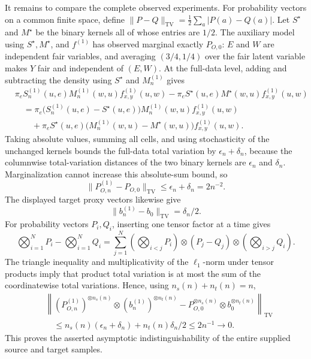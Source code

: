 It remains to compare the complete observed experiments.  For probability vectors on a common finite space, define
\(\lVert P-Q\rVert_{\mathrm{TV}}=\frac12\sum_a|P(a)-Q(a)|\).  Let \(S^{\star}\) and \(M^{\star}\) be the binary kernels all of whose entries are \(1/2\).  The auxiliary model using \(S^{\star},M^{\star}\), and \(f^{(1)}\) has observed marginal exactly \(P_{O,0}\): \(E\) and \(W\) are independent fair variables, and averaging \((3/4,1/4)\) over the fair latent variable makes \(Y\) fair and independent of \((E,W)\).  At the full-data level, adding and subtracting the density using \(S^{\star}\) and \(M_n^{(1)}\) gives
\[
\begin{aligned}
&\pi_eS_n^{(1)}(u,e)M_n^{(1)}(w,u)f^{(1)}_{x,y}(u,w)
-\pi_eS^{\star}(u,e)M^{\star}(w,u)f^{(1)}_{x,y}(u,w)\\
&\quad=\pi_e\bigl(S_n^{(1)}(u,e)-S^{\star}(u,e)\bigr)
M_n^{(1)}(w,u)f^{(1)}_{x,y}(u,w)\\
&\quad\quad+\pi_eS^{\star}(u,e)
\bigl(M_n^{(1)}(w,u)-M^{\star}(w,u)\bigr)f^{(1)}_{x,y}(u,w).
\end{aligned}
\]
Taking absolute values, summing all cells, and using stochasticity of the unchanged kernels bounds the full-data total variation by \(\epsilon_n+\delta_n\), because the columnwise total-variation distances of the two binary kernels are \(\epsilon_n\) and \(\delta_n\).  Marginalization cannot increase this absolute-sum bound, so
\[
\lVert P_{O,n}^{(1)}-P_{O,0}\rVert_{\mathrm{TV}}
\le\epsilon_n+\delta_n=2n^{-2}.
\]
The displayed target proxy vectors likewise give
\[
\lVert b_n^{(1)}-b_0\rVert_{\mathrm{TV}}=\delta_n/2.
\]
For probability vectors \(P_i,Q_i\), inserting one tensor factor at a time gives
\[
\bigotimes_{i=1}^N P_i-\bigotimes_{i=1}^N Q_i
=\sum_{j=1}^N
\left(\bigotimes_{i<j}P_i\right)\otimes(P_j-Q_j)\otimes
\left(\bigotimes_{i>j}Q_i\right).
\]
The triangle inequality and multiplicativity of the \(\ell_1\)-norm under tensor products imply that product total variation is at most the sum of the coordinatewise total variations.  Hence, using \(n_s(n)+n_t(n)=n\),
\[
\begin{aligned}
&\left\lVert
(P_{O,n}^{(1)})^{\otimes n_s(n)}\otimes(b_n^{(1)})^{\otimes n_t(n)}
-P_{O,0}^{\otimes n_s(n)}\otimes b_0^{\otimes n_t(n)}
\right\rVert_{\mathrm{TV}}\\
&\quad\le n_s(n)(\epsilon_n+\delta_n)+n_t(n)\delta_n/2
\le 2n^{-1}\longrightarrow0.
\end{aligned}
\]
This proves the asserted asymptotic indistinguishability of the entire supplied source and target samples.

